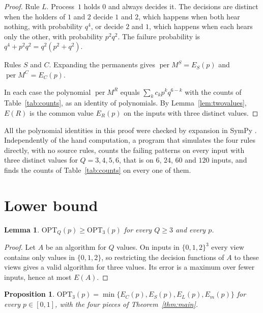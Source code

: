 \documentclass[11pt]{article}
\newtheorem{proposition}[theorem]{Proposition}
\newtheorem{lemma}[theorem]{Lemma}
\theoremstyle{remark}
\newcommand{\OPT}{\mathrm{OPT}}
\begin{document}
\begin{proof}
Rule $L$. Process~$1$ holds $0$ and always decides it. The decisions are distinct when the holders of $1$ and $2$ decide $1$ and $2$, which happens when both hear nothing, with probability $q^4$, or decide $2$ and $1$, which happens when each hears only the other, with probability $p^2q^2$. The failure probability is $q^4+p^2q^2=q^2(p^2+q^2)$.

Rules $S$ and $C$. Expanding the permanents gives $\operatorname{per}M^S=E_S(p)$ and $\operatorname{per}M^C=E_C(p)$.

In each case the polynomial $\operatorname{per}M^R$ equals $\sum_k c_kp^kq^{6-k}$ with the counts of Table~\ref{tab:counts}, as an identity of polynomials. By Lemma~\ref{lem:twovalues}, $E(R)$ is the common value $E_R(p)$ on the inputs with three distinct values.
\end{proof}

All the polynomial identities in this proof were checked by expansion in SymPy \cite{SymPy}. Independently of the hand computation, a program that simulates the four rules directly, with no source rules, counts the failing patterns on every input with three distinct values for $Q=3,4,5,6$, that is on $6$, $24$, $60$ and $120$ inputs, and finds the counts of Table~\ref{tab:counts} on every one of them.

\section{Lower bound}\label{sec:lower}

\begin{lemma}\label{lem:restrict}
$\OPT_Q(p)\ge\OPT_3(p)$ for every $Q\ge3$ and every $p$.
\end{lemma}

\begin{proof}
Let $A$ be an algorithm for $Q$ values. On inputs in $\{0,1,2\}^3$ every view contains only values in $\{0,1,2\}$, so restricting the decision functions of $A$ to these views gives a valid algorithm for three values. Its error is a maximum over fewer inputs, hence at most $E(A)$.
\end{proof}

\begin{proposition}\label{prop:lower}
$\OPT_3(p)=\min\{E_C(p),E_S(p),E_L(p),E_m(p)\}$ for every $p\in[0,1]$, with the four pieces of Theorem~\ref{thm:main}.
\end{proposition}
\end{document}
